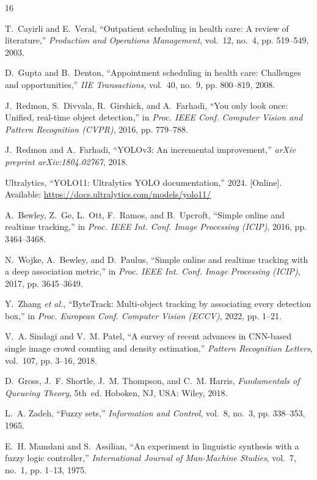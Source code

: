 \documentclass[conference]{IEEEtran}
\begin{document}
\begin{thebibliography}{16}

T.~Cayirli and E.~Veral, ``Outpatient scheduling in health care: A review of
literature,'' \emph{Production and Operations Management}, vol.~12, no.~4,
pp. 519--549, 2003.

D.~Gupta and B.~Denton, ``Appointment scheduling in health care: Challenges and
opportunities,'' \emph{IIE Transactions}, vol.~40, no.~9, pp. 800--819, 2008.

J.~Redmon, S.~Divvala, R.~Girshick, and A.~Farhadi, ``You only look once:
Unified, real-time object detection,'' in \emph{Proc. IEEE Conf. Computer
Vision and Pattern Recognition (CVPR)}, 2016, pp. 779--788.

J.~Redmon and A.~Farhadi, ``YOLOv3: An incremental improvement,''
\emph{arXiv preprint arXiv:1804.02767}, 2018.

Ultralytics, ``YOLO11: Ultralytics YOLO documentation,'' 2024. [Online].
Available: \url{https://docs.ultralytics.com/models/yolo11/}

A.~Bewley, Z.~Ge, L.~Ott, F.~Ramos, and B.~Upcroft, ``Simple online and
realtime tracking,'' in \emph{Proc. IEEE Int. Conf. Image Processing (ICIP)},
2016, pp. 3464--3468.

N.~Wojke, A.~Bewley, and D.~Paulus, ``Simple online and realtime tracking with
a deep association metric,'' in \emph{Proc. IEEE Int. Conf. Image Processing
(ICIP)}, 2017, pp. 3645--3649.

Y.~Zhang \emph{et al.}, ``ByteTrack: Multi-object tracking by associating every
detection box,'' in \emph{Proc. European Conf. Computer Vision (ECCV)}, 2022,
pp. 1--21.

V.~A. Sindagi and V.~M. Patel, ``A survey of recent advances in CNN-based
single image crowd counting and density estimation,'' \emph{Pattern
Recognition Letters}, vol.~107, pp. 3--16, 2018.

D.~Gross, J.~F. Shortle, J.~M. Thompson, and C.~M. Harris, \emph{Fundamentals
of Queueing Theory}, 5th~ed. Hoboken, NJ, USA: Wiley, 2018.

L.~A. Zadeh, ``Fuzzy sets,'' \emph{Information and Control}, vol.~8, no.~3,
pp. 338--353, 1965.

E.~H. Mamdani and S.~Assilian, ``An experiment in linguistic synthesis with a
fuzzy logic controller,'' \emph{International Journal of Man-Machine Studies},
vol.~7, no.~1, pp. 1--13, 1975.


\end{thebibliography}
\end{document}
